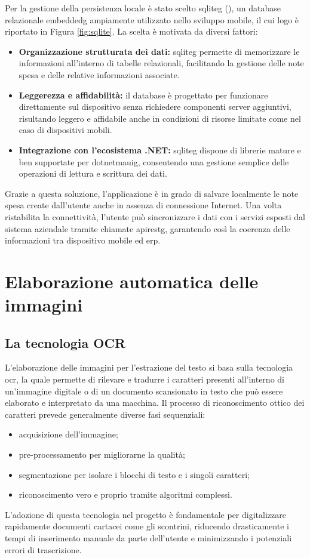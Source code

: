 \noindent Per la gestione della persistenza locale è stato scelto \gls{sqliteg} (\cite{site:sqlite}), un database relazionale \gls{embeddedg} ampiamente utilizzato nello sviluppo mobile, il cui logo è riportato in Figura \ref{fig:sqlite}. La scelta è motivata da diversi fattori:
\begin{itemize}
    \item \textbf{Organizzazione strutturata dei dati:} \gls{sqliteg} permette di memorizzare le informazioni all'interno di tabelle relazionali, facilitando la gestione delle note spesa e delle relative informazioni associate.
    \item \textbf{Leggerezza e affidabilità:} il database è progettato per funzionare direttamente sul dispositivo senza richiedere componenti server aggiuntivi, risultando leggero e affidabile anche in condizioni di risorse limitate come nel caso di dispositivi mobili.
    \item \textbf{Integrazione con l'ecosistema .NET:} \gls{sqliteg} dispone di librerie mature e ben supportate per \gls{dotnetmauig}, consentendo una gestione semplice delle operazioni di lettura e scrittura dei dati.
\end{itemize}
Grazie a questa soluzione, l'applicazione è in grado di salvare localmente le note spesa create dall'utente anche in assenza di connessione Internet. Una volta ristabilita la connettività, l'utente può sincronizzare i dati con i servizi esposti dal sistema aziendale tramite chiamate \gls{apirestg}, garantendo così la coerenza delle informazioni tra dispositivo mobile ed \gls{erp}.


\section{Elaborazione automatica delle immagini}
\label{sec:elaborazione-immagini}

\subsection*{La tecnologia OCR}
\label{subsec:teoria-ocr}
\noindent L'elaborazione delle immagini per l'estrazione del testo si basa sulla tecnologia \gls{ocr}, la quale permette di rilevare e tradurre i caratteri presenti all'interno di un'immagine digitale o di un documento scansionato in testo che può essere elaborato e interpretato da una macchina. 
Il processo di riconoscimento ottico dei caratteri prevede generalmente diverse fasi sequenziali: 
\begin{itemize}
    \item acquisizione dell'immagine;
    \item pre-processamento per migliorarne la qualità;
    \item segmentazione per isolare i blocchi di testo e i singoli caratteri;
    \item riconoscimento vero e proprio tramite algoritmi complessi.
\end{itemize} 
L'adozione di questa tecnologia nel progetto è fondamentale per digitalizzare rapidamente documenti cartacei come gli scontrini, riducendo drasticamente i tempi di inserimento manuale da parte dell'utente e minimizzando i potenziali errori di trascrizione.

